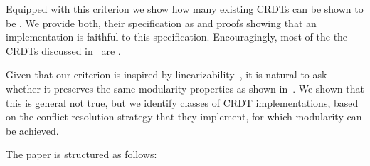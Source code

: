 Equipped with this criterion we show how many existing CRDTs can be
shown to be \crdtlinearizable{}.
%
We provide both, their specification as \CRDTLinshort{} and proofs
showing that an implementation is faithful to this specification.
%
Encouragingly, most of the the CRDTs discussed in~\cite{ShapiroPBZ11}
are \CRDTLinshort{}.

Given that our criterion is inspired by
linearizability~\cite{HerlihyW90}, it is natural to ask whether it
preserves the same modularity properties as shown
in~\cite{HerlihyW90}.
%
We shown that this is general not true, but we identify classes of
CRDT implementations, based on the conflict-resolution strategy that
they implement, for which modularity can be achieved.


The paper is structured as follows:
\begin{inparaitem}
\item {}
\end{inparaitem}






